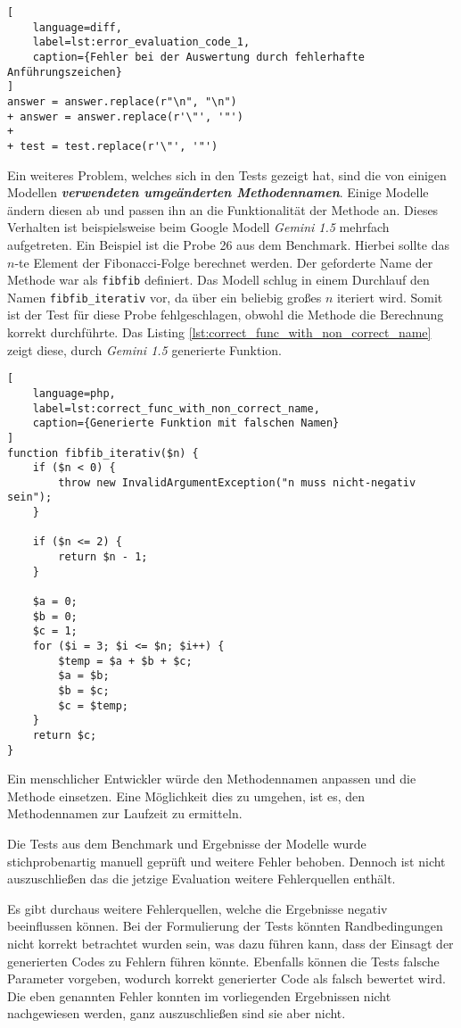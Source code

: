 \begin{lstlisting}[
	language=diff,
	label=lst:error_evaluation_code_1,
	caption={Fehler bei der Auswertung durch fehlerhafte Anführungszeichen}
]
answer = answer.replace(r"\n", "\n")
+ answer = answer.replace(r'\"', '"')
+ 
+ test = test.replace(r'\"', '"') 
\end{lstlisting}

Ein weiteres Problem, welches sich in den Tests gezeigt hat, sind die von einigen Modellen \textit{\textbf{verwendeten umgeänderten Methodennamen}}. Einige Modelle ändern diesen ab und passen ihn an die Funktionalität der Methode an. Dieses Verhalten ist beispielsweise beim Google Modell \textit{Gemini 1.5} mehrfach aufgetreten. Ein Beispiel ist die Probe 26 aus dem Benchmark. Hierbei sollte das $n$-te Element der Fibonacci-Folge berechnet werden. Der geforderte Name der Methode war als \texttt{fibfib} definiert. Das Modell schlug in einem Durchlauf den Namen \texttt{fibfib\_iterativ} vor, da über ein beliebig großes $n$ iteriert wird. Somit ist der Test für diese Probe fehlgeschlagen, obwohl die Methode die Berechnung korrekt durchführte. Das Listing \ref{lst:correct_func_with_non_correct_name} zeigt diese, durch \textit{Gemini 1.5} generierte Funktion.\vspace{0.2cm}

\begin{lstlisting}[
	language=php,
	label=lst:correct_func_with_non_correct_name,
	caption={Generierte Funktion mit falschen Namen}
]
function fibfib_iterativ($n) {
    if ($n < 0) {
        throw new InvalidArgumentException("n muss nicht-negativ sein");
    }

    if ($n <= 2) {
        return $n - 1;
    }

    $a = 0;
    $b = 0;
    $c = 1;
    for ($i = 3; $i <= $n; $i++) {
        $temp = $a + $b + $c;
        $a = $b;
        $b = $c;
        $c = $temp;
    }
    return $c;
}
\end{lstlisting}

Ein menschlicher Entwickler würde den Methodennamen anpassen und die Methode einsetzen. Eine Möglichkeit dies zu umgehen, ist es, den Methodennamen zur Laufzeit zu ermitteln. 

Die Tests aus dem Benchmark und Ergebnisse der Modelle wurde stichprobenartig manuell geprüft und weitere Fehler behoben. Dennoch ist nicht auszuschließen das die jetzige Evaluation weitere Fehlerquellen enthält.\vspace{0.2cm}

Es gibt durchaus weitere Fehlerquellen, welche die Ergebnisse negativ beeinflussen können. Bei der Formulierung der Tests könnten Randbedingungen nicht korrekt betrachtet wurden sein, was dazu führen kann, dass der Einsagt der generierten Codes zu Fehlern führen könnte. Ebenfalls können die Tests falsche Parameter vorgeben, wodurch korrekt generierter Code als falsch bewertet wird. Die eben genannten Fehler konnten im vorliegenden Ergebnissen nicht nachgewiesen werden, ganz auszuschließen sind sie aber nicht.

